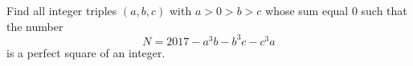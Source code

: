 Find all integer triples $(a,b,c)$ with $a>0>b>c$ whose sum equal $0$ such that the number$$N=2017-a^3b-b^3c-c^3a$$is a perfect square of an integer.